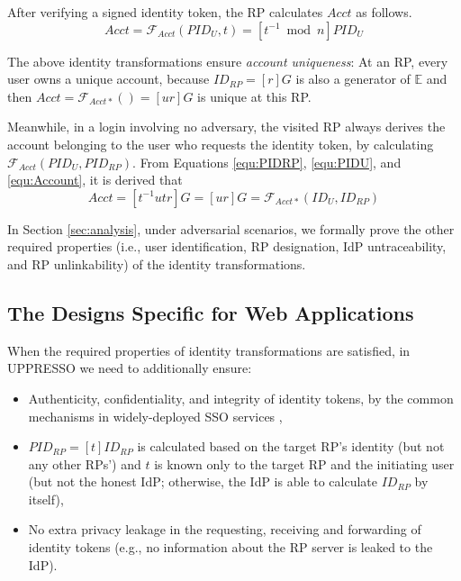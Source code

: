 After verifying a signed identity token, the RP calculates $Acct$ as follows.
\begin{equation}
Acct = \mathcal{F}_{Acct}(PID_{U},t)
   = [t^{-1} \bmod n]PID_{U}
   \label{equ:Account}
\end{equation}

The above identity transformations ensure \emph{account uniqueness}:
    At an RP, every user owns a unique account, because $ID_{RP} = [r]G$ is also a generator of $\mathbb{E}$ and then
     $Acct = \mathcal{F}_{Acct\ast}()=[ur]G$ is unique at this RP.

Meanwhile, in a login involving no adversary,
 the visited RP always derives the account belonging to the user who requests the identity token,
    by calculating $\mathcal{F}_{Acct}(PID_{U}, PID_{RP})$.
From Equations \ref{equ:PIDRP}, \ref{equ:PIDU}, and \ref{equ:Account}, it is derived that
\begin{equation}
   Acct =  [t^{-1}utr]G = [ur]G = \mathcal{F}_{Acct\ast}(ID_U, ID_{RP})
   \label{equ:AccountNotChanged}
\end{equation}


In Section \ref{sec:analysis},
    under adversarial scenarios, we formally prove the other required properties (i.e.,
    user identification, RP designation, IdP untraceability, and RP unlinkability) of the identity transformations.

\subsection{The Designs Specific for Web Applications}
\label{sec:web-design}

When the required properties of identity transformations are satisfied,
    in UPPRESSO we need to additionally ensure:
\begin{itemize}
  \item Authenticity, confidentiality, and integrity of identity tokens,
  by the common mechanisms in widely-deployed SSO services \cite{OpenIDConnect, rfc6749, SAML,GoogleIdIntegrate,de2014oauth,FettKS14,BrowserID,uber},
  \item $PID_{RP} = [t]{ID_{RP}}$ is calculated based on the target RP's identity (but not any other RPs') and $t$ is known only to the target RP and the initiating user (but not the honest IdP; otherwise, the IdP is able to calculate $ID_{RP}$ by itself),
  \item 
No extra privacy leakage in the requesting, receiving and forwarding of identity tokens
(e.g., no information about the RP server is leaked to the IdP).
\end{itemize}

